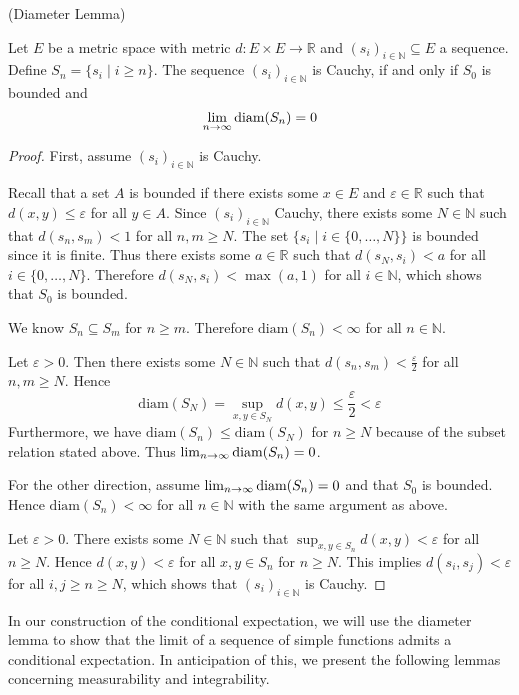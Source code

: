 \begin{lemma} (Diameter Lemma)\par
	Let $E$ be a metric space with metric $d : E \times E \rightarrow \mathbb{R}$ and $(s_i)_{i\in\mathbb{N}} \subseteq E$ a sequence. Define $S_n = \{s_i \; \vert \; i \ge n \}$. The sequence $(s_i)_{i\in\mathbb{N}}$ is Cauchy, if and only if $S_0$ is bounded and
	\[
		\lim_{n \to \infty} \textup{diam}(S_n) = 0
	\]
\end{lemma}
\begin{proof}
\;\newline
First, assume $(s_i)_{i\in\mathbb{N}}$ is Cauchy. 

Recall that a set $A$ is bounded if there exists some $x \in E$ and $\varepsilon \in \mathbb{R}$ such that $d(x,y) \le \varepsilon$ for all $y \in A$. Since $(s_i)_{i\in\mathbb{N}}$ Cauchy, there exists some $N \in \mathbb{N}$ such that $d(s_n,s_m) < 1$ for all $n, m \ge N$. The set $\{s_i \; \vert \; i \in \{0,\dots,N\}\}$ is bounded since it is finite. Thus there exists some $a \in \mathbb{R}$ such that $d(s_N, s_i) < a$ for all $i \in \{0,\dots,N\}$. Therefore $d(s_N, s_i) < \max(a,1)$ for all $i \in \mathbb{N}$, which shows that $S_0$ is bounded. 

We know $S_n \subseteq S_m$ for $n \ge m$. Therefore $\textrm{diam}(S_n) < \infty$ for all $n \in \mathbb{N}$.

Let $\varepsilon > 0$. Then there exists some $N \in \mathbb{N}$ such that $d(s_n,s_m) < \frac{\varepsilon}{2}$ for all $n, m \ge N$. Hence
\[
	\textrm{diam}(S_N) = \sup_{x,y \in S_N} d(x,y) \le \frac{\varepsilon}{2} < \varepsilon
\]
Furthermore, we have $\textrm{diam}(S_n) \le \textrm{diam}(S_N)$ for $n \ge N$ because of the subset relation stated above. Thus $\lim_{n \to \infty} \textup{diam}(S_n) = 0$.

For the other direction, assume $\lim_{n \to \infty} \textup{diam}(S_n) = 0$ and that $S_0$ is bounded. Hence $\textrm{diam}(S_n) < \infty$ for all $n \in \mathbb{N}$ with the same argument as above. 

Let $\varepsilon > 0$. There exists some $N \in \mathbb{N}$ such that $\sup_{x,y \in S_n} d(x,y) < \varepsilon$ for all $n \ge N$. Hence $d(x,y) < \varepsilon$ for all $x, y \in S_n$ for $n \ge N$. This implies $d(s_i,s_j) < \varepsilon$ for all $i, j \ge n \ge N$, which shows that $(s_i)_{i\in\mathbb{N}}$ is Cauchy.
\end{proof}

In our construction of the conditional expectation, we will use the diameter lemma to show that the limit of a sequence of simple functions admits a conditional expectation. In anticipation of this, we present the following lemmas concerning measurability and integrability.

